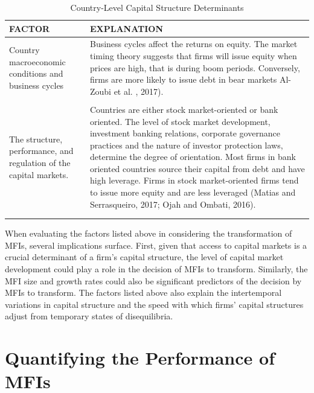 \documentclass[a4paper,nobind]{templates/ociamthesis}
\begin{document}
\begin{landscape}
\begin{table}
\caption{\label{tab:unnamed-chunk-14}Country-Level Capital Structure Determinants}
\centering
\fontsize{8}{10}\selectfont
\begin{tabu} to 
\toprule
FACTOR & EXPLANATION\\
\midrule
Country macroeconomic conditions and business cycles & Business cycles affect the returns on equity. The market timing theory suggests that firms will issue equity when prices are high, that is during boom periods. Conversely, firms are more likely to issue debt in bear markets Al-Zoubi et al. , 2017).\\
 & \\
The structure, performance, and regulation of the capital markets. & Countries are either stock market-oriented or bank oriented. The level of stock market development, investment banking relations, corporate governance practices and the nature of investor protection laws, determine the degree of orientation. Most firms in bank oriented countries source their capital from debt and have high leverage. Firms in stock market-oriented firms tend to issue more equity and are less leveraged (Matias and Serrasqueiro, 2017; Ojah and Ombati, 2016).\\
\bottomrule
{}\\
\\
\end{tabu}
\end{table}

\end{landscape}

When evaluating the factors listed above in considering the transformation of MFIs, several implications surface. First, given that access to capital markets is a crucial determinant of a firm's capital structure, the level of capital market development could play a role in the decision of MFIs to transform. Similarly, the MFI size and growth rates could also be significant predictors of the decision by MFIs to transform. The factors listed above also explain the intertemporal variations in capital structure and the speed with which firms' capital structures adjust from temporary states of disequilibria.

\hypertarget{quantifying-the-performance-of-mfis}{%
\section{Quantifying the Performance of MFIs}\label{quantifying-the-performance-of-mfis}}
\end{document}
